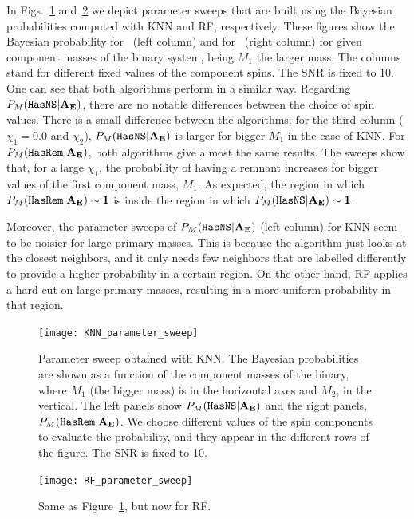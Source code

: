 In Figs.~\ref{fig:param_sweep_KNN} and~\ref{fig:param_sweep_RF} we depict parameter sweeps that are built using the Bayesian probabilities computed with \ac{KNN} and \ac{RF}, respectively.  These figures show the Bayesian probability for \hasns\ (left column) and for \hasrem\ (right column) for given component masses of the binary system, being $M_1$ the larger mass. The  columns stand for different fixed values of the component spins. The SNR is fixed to 10. One can see that both algorithms perform in a similar way. Regarding $P_M({{\tt HasNS}} |\bf{A_E})$,  there are no notable differences between the choice of spin values.  There is a small difference between the algorithms: for the third column ($\chi_1 = 0.0$ and $\chi_2$), $P_M({{\tt HasNS}} |\bf{A_E})$ is larger for bigger $M_1$ in the case of \ac{KNN}. For $P_M({{\tt HasRem}} |\bf{A_E})$, both algorithms give almost the same results. The sweeps show that, for a large $\chi_1$, the probability of having a remnant increases for bigger values of the first component mass, $M_1$. As expected, the region in which $P_M({{\tt HasRem}} |\bf{A_E}) \sim 1$ is inside the region in which $P_M({{\tt HasNS}} |\bf{A_E}) \sim 1$.

Moreover, the parameter sweeps of $P_M({{\tt HasNS}} |\bf{A_E})$ (left column) for \ac{KNN} seem to be noisier for large primary masses. This is because the algorithm just looks at the closest neighbors, and it only needs few neighbors that are labelled differently to provide a higher probability in a certain region. On the other hand, \ac{RF} applies a hard cut on large primary masses, resulting in a more uniform probability in that region. 

\begin{figure}%
\texttt{[image: KNN\_parameter\_sweep]}
    \caption{Parameter sweep obtained with \ac{KNN}. The Bayesian probabilities are shown as a function of the component masses of the binary, where $M_1$ (the bigger mass) is in the horizontal axes and $M_2$, in the vertical. The left panels show $P_M({{\tt HasNS}} |\bf{A_E})$ and the right panels, $P_M({{\tt HasRem}} |\bf{A_E})$. We choose different values of the spin components to evaluate the probability, and they appear in the different rows of the figure.   The SNR is fixed to 10. }
\label{fig:param_sweep_KNN}
\end{figure}

\begin{figure}%
\texttt{[image: RF\_parameter\_sweep]}
 \caption{Same as Figure~\ref{fig:param_sweep_KNN}, but now for \ac{RF}.}
\label{fig:param_sweep_RF}
\end{figure}


